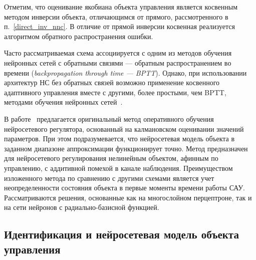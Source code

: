 Отметим, что оценивание якобиана объекта управления является косвенным
методом инверсии объекта, отличающимся от прямого, рассмотренного в
п.~\ref{direct_inv_nnc}.  В отличие от прямой инверсии косвенная
реализуется алгоритмом обратного распространения ошибки.


Часто рассматриваемая схема ассоциируется с одним из методов обучения
нейронных сетей с обратными связями --- обратным распространением во
времени ({\it backpropagation through time --- BPTT}).  Однако, при
использовании архитектур НС без обратных связей возможно применение
косвенного адаптивного управления вместе с другими, более простыми,
чем BPTT, методами обучения нейронных сетей~\cite{narpart92}.

В работе~\cite{fabri98} предлагается оригинальный метод оперативного
обучения нейросетевого регулятора, основанный на калмановском
оценивании значений параметров.  При этом подразумевается, что
нейросетевая модель объекта в заданном диапазоне аппроксимации
функционирует точно.  Метод предназначен для нейросетевого
регулирования нелинейным объектом, афинным по управлению, с аддитивной
помехой в канале наблюдения.  Преимуществом изложенного метода по
сравнению с другими схемами является учет неопределенности состояния
объекта в первые моменты времени работы САУ.  Рассматриваются решения,
основанные как на многослойном перцептроне, так и на сети нейронов с
радиально-базисной функцией.



\subsection{Идентификация и нейросетевая модель объекта управления}%
\label{identif_and_nnp}

